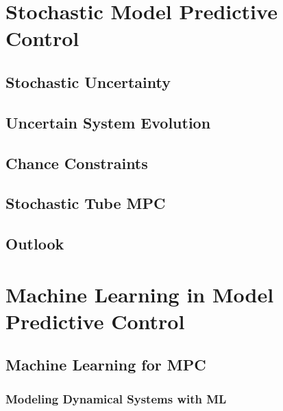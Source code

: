 \chapter{Stochastic Model Predictive Control} %
	\label{c:mpcStochastic}


	\section{Stochastic Uncertainty} %

	\section{Uncertain System Evolution} %

	\section{Chance Constraints} %

	\section{Stochastic Tube MPC} %

	\section{Outlook} %

\chapter{Machine Learning in Model Predictive Control} %
	\label{c:ml}


	\section{Machine Learning for MPC} %

		\subsection{Modeling Dynamical Systems with ML} %

